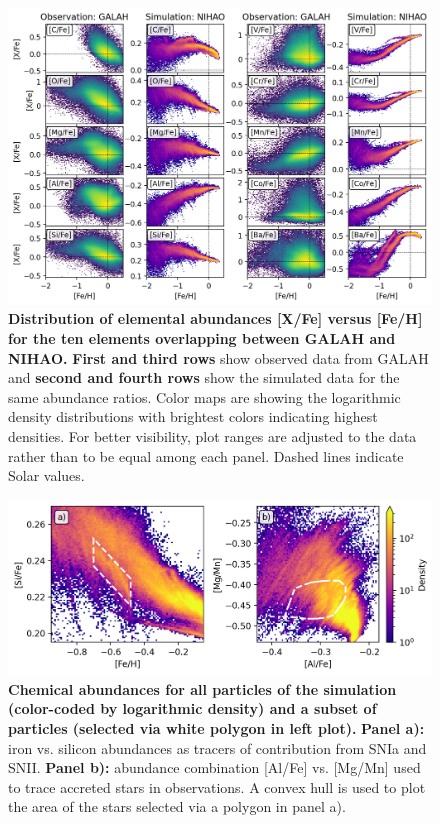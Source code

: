 \documentclass[fleqn,usenatbib]{mnras}
\begin{document}
\begin{figure}
	\includegraphics[width=\textwidth]{figures/Overview_FeH_XFe_Obs_Sim.png}
    \caption{
    \textbf{Distribution of elemental abundances [X/Fe] versus [Fe/H] for the ten elements overlapping between GALAH and NIHAO.} 
    \textbf{First and third rows} show observed data from GALAH and \textbf{second and fourth rows} show the simulated data for the same abundance ratios. Color maps are showing the logarithmic density distributions with brightest colors indicating highest densities. For better visibility, plot ranges are adjusted to the data rather than to be equal among each panel. Dashed lines indicate Solar values.}
    \label{fig:FeH_XFe}
\end{figure}

\begin{figure}
	\includegraphics[width=\textwidth]{figures/low_alpha_halo.png}
    \caption{
    \textbf{Chemical abundances for all particles of the simulation (color-coded by logarithmic density) and a subset of particles (selected via white polygon in left plot).} 
    \textbf{Panel a):} iron vs. silicon abundances as tracers of contribution from SNIa and SNII. \textbf{Panel b):} abundance combination [Al/Fe] vs. [Mg/Mn] used to trace accreted stars in observations. A convex hull is used to plot the area of the stars selected via a polygon in panel a).}
    \label{fig:low_alpha_halo}
\end{figure}
\end{document}
